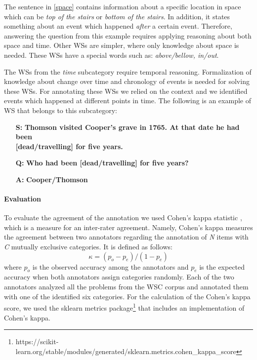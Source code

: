 The sentence in \ref{space} contains information about a specific location in space which can be \textit{top of the stairs} or \textit{bottom of the stairs}. In addition, it states something about an event which happened \textit{after} a certain event. Therefore, answering the question from this example requires applying reasoning about both space and time. Other WSs are simpler, where only knowledge about space is needed. These WSs have a special words such as: \textit{above/bellow, in/out}.

The WSs from the \textit{time} subcategory require temporal reasoning. 
Formalization of knowledge about change over time and chronology of events is needed for solving these WSs. For annotating these WSs we relied on the context and we identified events which happened at different points in time. The following is an example of WS that belongs to this subcategory:

\begin{itemize} \label{Ex2}
	\item[\textbf{S:}] \textbf{Thomson visited Cooper's grave in 1765. At that date he had been} \\ \textbf{[dead/travelling] for five years.}
	\item[\textbf{Q:}] \textbf{ Who had been [dead/travelling] for five years? }
	\item[\textbf{A:}] \textbf{Cooper/Thomson}
\end{itemize}



\paragraph{Evaluation}
To evaluate the agreement of the annotation 
we used Cohen's kappa statistic \cite{doi:10.1177/001316446002000104}, which is a measure for an inter-rater agreement. Namely, Cohen's kappa measures the agreement between two annotators regarding the annotation of \textit{N} items with \textit{C} mutually exclusive categories. 
It is defined as follows: 
\begin{equation}
	\kappa = (p_o-p_e)/(1-p_e)
\end{equation}
where $p_o$ is the observed accuracy among the annotators and $p_e$ is the expected accuracy when both annotators assign categories randomly. Each of the two annotators analyzed all the problems from the WSC corpus and annotated them with one of the identified six categories. For the calculation of the Cohen's kappa score, we used the sklearn metrics  package\footnote{https://scikit-learn.org/stable/modules/generated/sklearn.metrics.cohen\_kappa\_score} that includes an implementation of Cohen's kappa.

